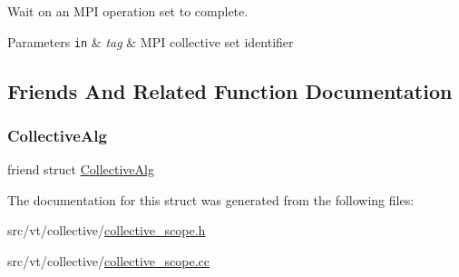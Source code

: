 Wait on an M\+PI operation set to complete. 


\begin{DoxyParams}[1]{Parameters}
\mbox{\tt in}  & {\em tag} & M\+PI collective set identifier \\
\hline
\end{DoxyParams}


\subsection{Friends And Related Function Documentation}
\mbox{\label{structvt_1_1collective_1_1_collective_scope_aa2494f91f09e2ba6a5baae9ee9de430e}} 
\subsubsection{\texorpdfstring{Collective\+Alg}{CollectiveAlg}}
{\footnotesize\ttfamily friend struct \hyperlink{structvt_1_1collective_1_1_collective_alg}{Collective\+Alg}\hspace{0.3cm}{\ttfamily [friend]}}



The documentation for this struct was generated from the following files\+:\begin{DoxyCompactItemize}
\item 
src/vt/collective/\hyperlink{collective__scope_8h}{collective\+\_\+scope.\+h}\item 
src/vt/collective/\hyperlink{collective__scope_8cc}{collective\+\_\+scope.\+cc}\end{DoxyCompactItemize}
